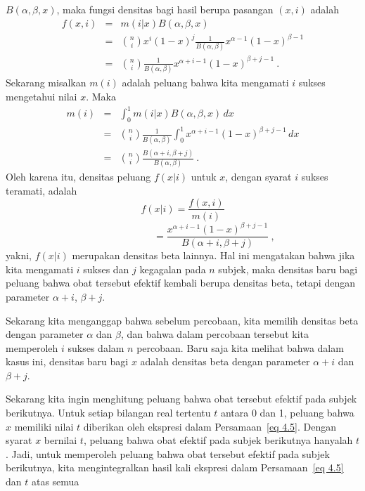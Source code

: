 \begin{example}
$B(\alpha,\beta,x)$, maka fungsi densitas bagi hasil berupa
pasangan $(x,i)$ adalah
\begin{eqnarray*}
f(x,i) & = & m(i|x)B(\alpha,\beta,x) \\
       & = & {n \choose i} x^i(1 - x)^j \frac 1{B(\alpha,\beta)} x^{\alpha - 1}(1 -
x)^{\beta - 1} \\
       & = & {n \choose i}  \frac 1{B(\alpha,\beta)} x^{\alpha + i - 1}(1 - x)^{\beta +
j - 1}\ .
\end{eqnarray*}
Sekarang misalkan $m(i)$ adalah peluang bahwa kita mengamati $i$ sukses 
mengetahui nilai $x$.  Maka
\begin{eqnarray*}
m(i) & = & \int_0^1 m(i|x) B(\alpha,\beta,x)\,dx \\
     & = & {n \choose i} \frac 1{B(\alpha,\beta)} \int_0^1 x^{\alpha + i - 1}(1 -
x)^{\beta + j - 1}\,dx \\
     & = & {n \choose i} \frac {B(\alpha + i,\beta + j)}{B(\alpha,\beta)}\ .
\end{eqnarray*}
Oleh karena itu, densitas peluang $f(x|i)$ untuk $x$, dengan syarat $i$ sukses
teramati, adalah
$$
f(x|i)  =  \frac {f(x,i)}{m(i)} 
$$
\begin{equation}
\ \ \ \ \ \ \ \ \ \ \ \ \ \ \ \ \ \ \ \ \ \ \ \ \ \ \ \ \ =  
\frac {x^{\alpha + i - 1}(1 - x)^{\beta + j - 1}}{B(\alpha + i,\beta
+ j)}\ ,\label{eq 4.5}
\end{equation}
yakni, $f(x|i)$ merupakan densitas beta lainnya.  Hal ini mengatakan bahwa jika kita mengamati $i$
sukses dan $j$ kegagalan pada $n$ subjek, maka densitas baru bagi
peluang bahwa obat tersebut efektif kembali berupa densitas beta, tetapi dengan
parameter $\alpha + i$, $\beta + j$.
\par
Sekarang kita menganggap bahwa sebelum percobaan, kita memilih densitas beta dengan
parameter $\alpha$ dan $\beta$, dan bahwa dalam percobaan tersebut
kita memperoleh $i$ sukses dalam $n$ percobaan.  Baru saja kita melihat bahwa dalam kasus ini,
densitas baru bagi $x$
adalah densitas beta dengan parameter $\alpha + i$ dan $\beta + j$.  
\par
Sekarang kita ingin menghitung peluang bahwa obat tersebut efektif pada subjek berikutnya.  Untuk setiap
bilangan real tertentu $t$ antara 0 dan 1, peluang bahwa $x$ memiliki nilai $t$ diberikan oleh
ekspresi dalam Persamaan~\ref{eq 4.5}.  Dengan syarat $x$ bernilai $t$, peluang bahwa obat
efektif pada subjek berikutnya hanyalah $t$.  Jadi, untuk memperoleh peluang bahwa obat tersebut efektif
pada subjek berikutnya, kita mengintegralkan hasil kali ekspresi dalam Persamaan~\ref{eq 4.5} dan $t$ atas semua

\end{example}
